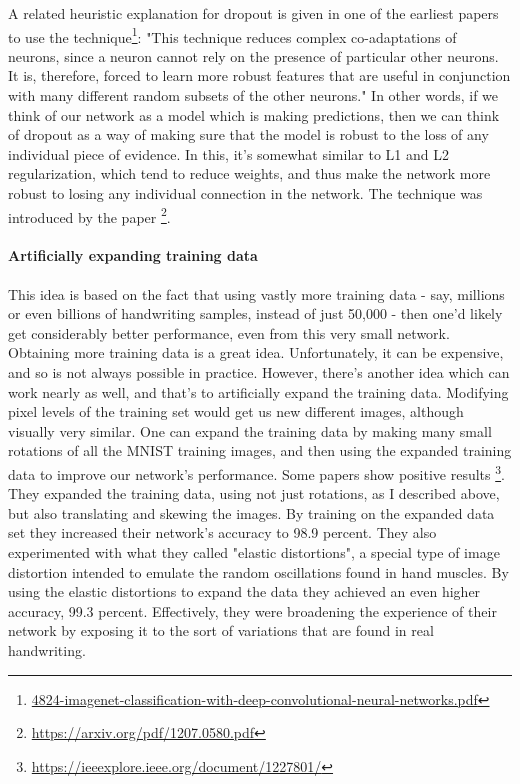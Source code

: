 \documentclass[12pt, letterpaper]{article}
\theoremstyle{definition}
\let\tb\textbf
\begin{document}
A related heuristic explanation for dropout is given in one of the earliest papers to use the technique\footnote{\href{https://papers.nips.cc/paper/4824-imagenet-classification-with-deep-convolutional-neural-networks.pdf}{4824-imagenet-classification-with-deep-convolutional-neural-networks.pdf}}: "This technique reduces complex co-adaptations of neurons, since a neuron cannot rely on the presence of particular other neurons. It is, therefore, forced to learn more robust features that are useful in conjunction with many different random subsets of the other neurons." In other words, if we think of our network as a model which is making predictions, then we can think of dropout as a way of making sure that the model is robust to the loss of any individual piece of evidence. In this, it's somewhat similar to L1 and L2 regularization, which tend to reduce weights, and thus make the network more robust to losing any individual connection in the network. The technique was introduced by the paper \footnote{\url{https://arxiv.org/pdf/1207.0580.pdf}}.


\paragraph{\tb{Artificially expanding training data}} This idea is based on the fact that using vastly more training data - say, millions or even billions of handwriting samples, instead of just 50,000 - then one'd likely get considerably better performance, even from this very small network. Obtaining more training data is a great idea. Unfortunately, it can be expensive, and so is not always possible in practice. However, there's another idea which can work nearly as well, and that's to artificially expand the training data. Modifying pixel levels of the training set would get us new different images, although visually very similar. One can expand the training data by making many small rotations of all the MNIST training images, and then using the expanded training data to improve our network's performance. Some papers show positive results \footnote{\url{https://ieeexplore.ieee.org/document/1227801/}}. They expanded the training data, using not just rotations, as I described above, but also translating and skewing the images. By training on the expanded data set they increased their network's accuracy to 98.9 percent. They also experimented with what they called "elastic distortions", a special type of image distortion intended to emulate the random oscillations found in hand muscles. By using the elastic distortions to expand the data they achieved an even higher accuracy, 99.3 percent. Effectively, they were broadening the experience of their network by exposing it to the sort of variations that are found in real handwriting.
\end{document}
